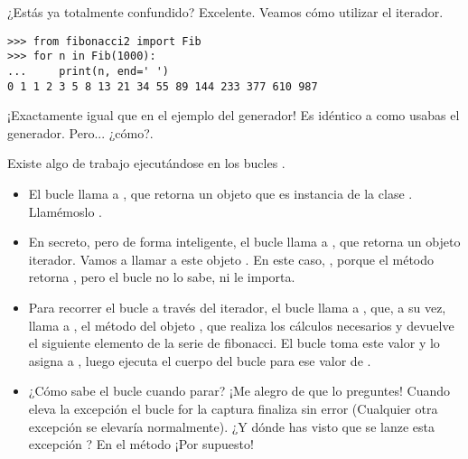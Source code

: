 ¿Estás ya totalmente confundido? Excelente. Veamos cómo utilizar el iterador.

\noindent\begin{minipage}{\textwidth}
\begin{lstlisting}[mathescape=True]
>>> from fibonacci2 import Fib
>>> for n in Fib(1000):
...     print(n, end=' ')
0 1 1 2 3 5 8 13 21 34 55 89 144 233 377 610 987
\end{lstlisting}
\end{minipage}

¡Exactamente igual que en el ejemplo del generador! Es idéntico a como usabas el generador. Pero... ¿cómo?.

Existe algo de trabajo ejecutándose en los bucles .

\begin{itemize}

\item El bucle  llama a , que retorna un objeto que es instancia de la clase . Llamémoslo . 

\item En secreto, pero de forma inteligente, el bucle  llama a , que retorna un objeto iterador. Vamos a llamar a este objeto . En este caso, , porque el método  retorna , pero el bucle  no lo sabe, ni le importa.

\item Para recorrer el bucle a través del iterador, el bucle  llama a , que, a su vez, llama a , el método  del objeto , que realiza los cálculos necesarios y devuelve el siguiente elemento de la serie de fibonacci. El bucle  toma este valor y lo asigna a , luego ejecuta el cuerpo del bucle para ese valor de .

\item ¿Cómo sabe el bucle  cuando parar? ¡Me alegro de que lo preguntes! Cuando  eleva la excepción  el bucle for la captura finaliza sin error (Cualquier otra excepción se elevaría normalmente). ¿Y dónde has visto que se lanze esta excepción ? En el método  ¡Por supuesto!

\end{itemize}

